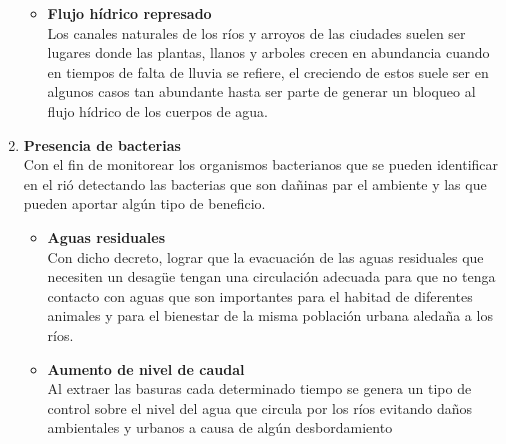 \begin{enumerate}
\begin{itemize}
		      \item \textbf{Flujo hídrico represado}\\
		            Los canales naturales de los ríos y arroyos de las ciudades suelen ser lugares donde las plantas, llanos y arboles crecen en abundancia cuando en tiempos de falta de lluvia se refiere, el creciendo de estos suele ser en algunos casos tan abundante hasta ser parte de generar un bloqueo al flujo hídrico de los cuerpos de agua.
	      \end{itemize}
	\item \textbf{Presencia de bacterias}\\
	      Con el fin de monitorear los organismos bacterianos que se pueden identificar en el rió detectando las bacterias que son dañinas par el ambiente y las que pueden aportar algún tipo de beneficio.
	      \begin{itemize}
		      \item \textbf{Aguas residuales} \\
		            Con dicho decreto, lograr que la evacuación de las aguas residuales que necesiten un desagüe tengan una circulación adecuada para que no tenga contacto con aguas que son importantes para el habitad de diferentes animales y para el bienestar de la misma población urbana aledaña a los ríos.
		      \item \textbf{Aumento de nivel de caudal} \\
		            Al extraer las basuras cada determinado tiempo se genera un tipo de control sobre el nivel del agua que circula por los ríos evitando daños ambientales y urbanos a causa de algún desbordamiento


\end{itemize}
\end{enumerate}
